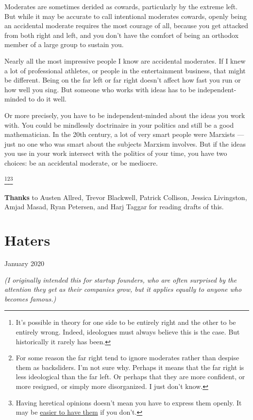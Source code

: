\documentclass[12pt]{book}
\begin{document}
Moderates are sometimes derided as cowards, particularly by the extreme
left. But while it may be accurate to call intentional moderates
cowards, openly being an accidental moderate requires the most courage
of all, because you get attacked from both right and left, and you don't
have the comfort of being an orthodox member of a large group to sustain
you.

Nearly all the most impressive people I know are accidental moderates.
If I knew a lot of professional athletes, or people in the entertainment
business, that might be different. Being on the far left or far right
doesn't affect how fast you run or how well you sing. But someone who
works with ideas has to be independent-minded to do it well.

Or more precisely, you have to be independent-minded about the ideas you
work with. You could be mindlessly doctrinaire in your politics and
still be a good mathematician. In the 20th century, a lot of very smart
people were Marxists --- just no one who was smart about the subjects
Marxism involves. But if the ideas you use in your work intersect with
the politics of your time, you have two choices: be an accidental
moderate, or be mediocre.


\footnote{It's possible in theory for one side to be entirely right and
the other to be entirely wrong. Indeed, ideologues must always believe
this is the case. But historically it rarely has been.}\footnote{For some reason the far right tend to ignore moderates rather
than despise them as backsliders. I'm not sure why. Perhaps it means
that the far right is less ideological than the far left. Or perhaps
that they are more confident, or more resigned, or simply more
disorganized. I just don't know.}\footnote{Having heretical opinions doesn't mean you have to express them
openly. It may be \href{say.html}{easier to have them} if you don't.}

\textbf{Thanks} to Austen Allred, Trevor Blackwell, Patrick Collison,
Jessica Livingston, Amjad Masad, Ryan Petersen, and Harj Taggar for
reading drafts of this.
\chapter{Haters}

January 2020

\emph{(I originally intended this for startup founders, who are often
surprised by the attention they get as their companies grow, but it
applies equally to anyone who becomes famous.)}
\end{document}
